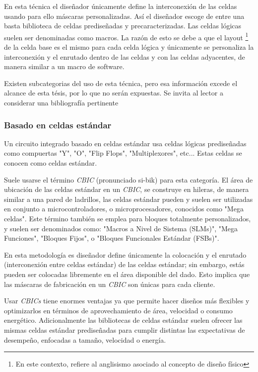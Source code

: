 {En esta técnica el diseñador únicamente define la interconexión de las celdas usando para ello máscaras personalizadas. Así el diseñador escoge de entre una basta biblioteca de celdas prediseñadas y precaracterizadas. Las celdas lógicas suelen ser denominadas como macros. La razón de esto se debe a que el layout \footnote{En este contexto, refiere al anglisismo asociado al concepto de diseño físico} de la celda base es el mismo para cada celda lógica y únicamente se personaliza la interconexión y el enrutado dentro de las celdas y con las celdas adyacentes, de manera similar a un macro de software.

Existen subcategorias del uso de esta técnica, pero esa información excede el alcance de esta tésis, por lo que no serán expuestas. Se invita al lector a considerar una bibliografía pertinente \cite{book:johnM1997,book:barrK2006}

\subsubsection{Basado en celdas estándar}

Un circuito integrado basado en celdas estándar usa celdas lógicas prediseñadas como compuertas "Y", "O", "Flip Flops", "Multiplexores", etc... Estas celdas se conocen como celdas estándar.

Suele usarse el término \textit{CBIC} (pronunciado si-bik) para esta categoría. El área de ubicación de las celdas estándar en un \textit{CBIC}, se construye en hileras, de manera similar a una pared de ladrillos, las celdas estándar pueden y suelen ser utilizadas en conjunto a microcontroladores, o microprocesadores, conocidos como "Mega celdas". Este término también se emplea para bloques totalmente personalizados, y suelen ser denominados como: "Macros a Nivel de Sistema (SLMs)", "Mega Funciones", "Bloques Fijos", o "Bloques Funcionales Estándar (FSBs)".

En esta metodología es diseñador define únicamente la colocación y el enrutado (interconexión entre celdas estándar) de las celdas estándar; sin embargo, estás pueden ser colocadas libremente en el área disponible del dado. Esto implica que las máscaras de fabricación en un \textit{CBIC} son únicas para cada cliente.

Usar \textit{CBICs} tiene enormes ventajas ya que permite hacer diseños más flexibles y optimizarlos en términos de aprovechamiento de área, velocidad o consumo energético. Adicionalmente las bibliotecas de celdas estándar suelen ofrecer las mismas celdas estándar prediseñadas para cumplir distintas las expectativas de desempeño, enfocadas a tamaño, velocidad o energía.

}
